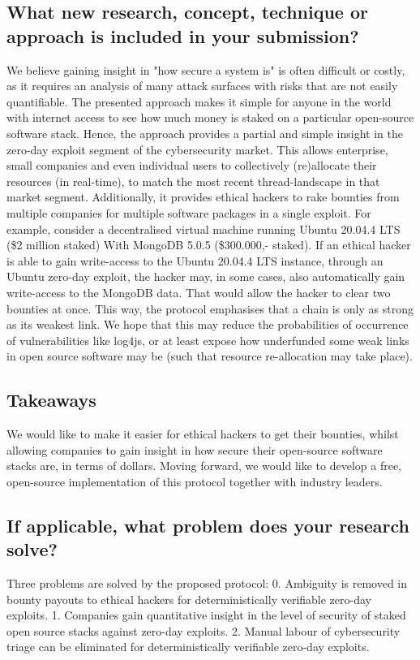 \documentclass{article}
\begin{document}
\subsection{What new research, concept, technique or approach is included in your submission?}
We believe gaining insight in "how secure a system is" is often difficult or costly, as it requires an analysis of many attack surfaces with risks that are not easily quantifiable. The presented approach makes it simple for anyone in the world with internet access to see how much money is staked on a particular open-source software stack. Hence, the approach provides a partial and simple insight in the zero-day exploit segment of the cybersecurity market. This allows enterprise, small companies and even individual users to collectively (re)allocate their resources (in real-time), to match the most recent thread-landscape in that market segment. Additionally, it provides ethical hackers to rake bounties from multiple companies for multiple software packages in a single exploit. For example, consider a decentralised virtual machine running Ubuntu 20.04.4 LTS (\$2 million staked) With MongoDB 5.0.5 (\$300.000,- staked). If an ethical hacker is able to gain write-access to the Ubuntu 20.04.4 LTS instance, through an Ubuntu zero-day exploit, the hacker may, in some cases, also automatically gain write-access to the MongoDB data. That would allow the hacker to clear two bounties at once. This way, the protocol emphasises that a chain is only as strong as its weakest link. We hope that this may reduce the probabilities of occurrence of vulnerabilities like log4js, or at least expose how underfunded some weak links in open source software may be (such that resource re-allocation may take place).

\subsection{Takeaways}
We would like to make it easier for ethical hackers to get their bounties, whilst allowing companies to gain insight in how secure their open-source software stacks are, in terms of dollars. Moving forward, we would like to develop a free, open-source implementation of this protocol together with industry leaders.
\subsection{If applicable, what problem does your research solve?}
Three problems are solved by the proposed protocol:
0. Ambiguity is removed in bounty payouts to ethical hackers for deterministically verifiable zero-day exploits.
1. Companies gain quantitative insight in the level of security of staked open source stacks against zero-day exploits.
2. Manual labour of cybersecurity triage can be eliminated for deterministically verifiable zero-day exploits.
\end{document}
